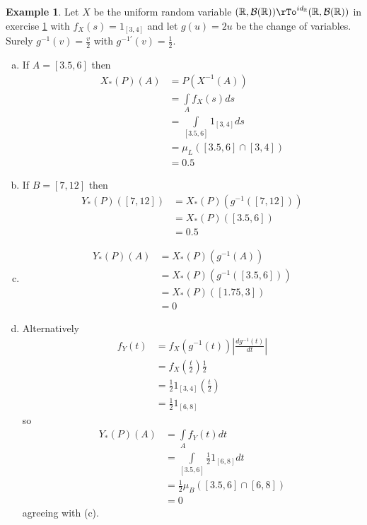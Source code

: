 \documentclass[12pt]{amsart}
\theoremstyle{definition}
\newtheorem{example}[theorem]{Example}
\begin{document}
\begin{example} \label{define_uniform_random_variable} Let $X$ be the uniform random variable $(\mathbb{R}, \mathcal{B}(\mathbb{R})) \rTo^{id_{\mathbb{R}}} (\mathbb{R}, \mathcal{B}(\mathbb{R}))$ in exercise \ref{define_uniform_random_variable} with $f_X(s) = 1_{[3,4]}$ and let $g(u) = 2u$ be the change of variables. Surely $g^{-1}(v) = \frac{v}{2}$ with $g^{-1'}(v) = \frac{1}{2}$.
\begin{enumerate}[a.]
\item If $A = [3.5, 6]$ then
\begin{align*}
X_*(P)(A) & = P(X^{-1}(A)) \\
 & = \int\limits_A f_X(s)ds \\
 & = \int\limits_{[3.5, 6]} 1_{[3,4]} ds \\
 & = \mu_L([3.5, 6] \cap [3,4]) \\
 & = 0.5
\end{align*}
\item If $B = [7,12]$ then
\begin{align*}
Y_*(P)([7,12]) & = X_*(P)(g^{-1}([7,12])) \\
 & = X_*(P)([3.5,6]) \\
 & = 0.5
\end{align*}
\item
\begin{align*}
Y_*(P)(A) & = X_*(P)(g^{-1}(A)) \\
 & =  X_*(P)(g^{-1}([3.5,6])) \\
 & = X_*(P)([1.75, 3]) \\
 & = 0
\end{align*}
\item Alternatively
\begin{align*}
f_Y(t) & = f_X(g^{-1}(t)) \left|\frac{dg^{-1}(t)}{dt}\right| \\
 & = f_X \left( \frac{t}{2} \right) \frac{1}{2} \\
 & = \frac{1}{2}1_{[3,4]} \left( \frac{t}{2} \right) \\
 & = \frac{1}{2}1_{[6,8]}
\end{align*}
so
\begin{align*}
Y_*(P)(A) & = \int\limits_A f_Y(t) dt \\
 & = \int\limits_{[3.5,6]} \frac{1}{2}1_{[6,8]} dt \\
 & = \frac{1}{2} \mu_B([3.5,6] \cap [6,8]) \\
 & = 0
\end{align*}
agreeing with (c).
\end{enumerate}
\end{example}
\end{document}
